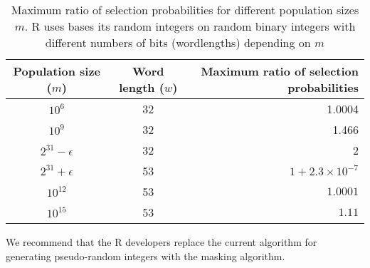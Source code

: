 \documentclass[12pt]{article}
\begin{document}
\begin{table}[h]
\caption{Maximum ratio of selection probabilities for different population sizes $m$. 
R uses bases its random integers on random binary integers with different numbers of bits (wordlengths) depending on $m$}
\begin{center}
\begin{tabular}{|c|c|r|}

\hline
Population size ($m$) & Word length ($w$) & Maximum ratio of selection probabilities\\
\hline 
$10^6$ & 32 & 1.0004 \\
$10^9$ & 32 & 1.466 \\
 $2^{31}-\epsilon$ & 32 & 2 \\
$2^{31}+\epsilon$ & 53 & $1 + 2.3 \times 10^{-7}$ \\
$10^{12}$ & 53 & $1.0001$ \\
$10^{15}$ & 53 & $1.11$ \\
\hline

\end{tabular}
\end{center}
\label{tab}
\end{table}%

We recommend that the R developers replace the current algorithm for generating pseudo-random integers with the masking algorithm.



\end{document}
